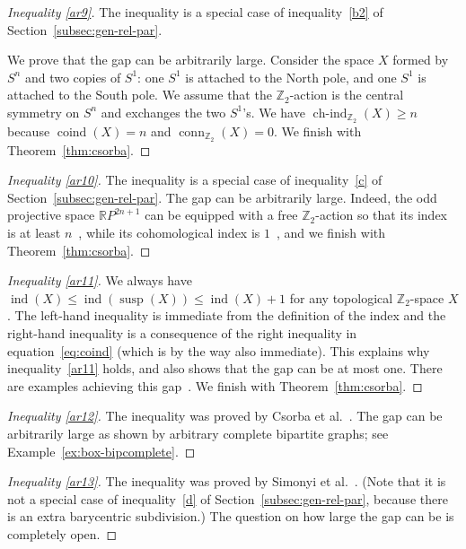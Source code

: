 \documentclass[12pt]{amsart}
\theoremstyle{definition}
\def\R{\mathbb{R}}
\def\Z{\mathbb{Z}}
\renewcommand{\geq}{\geqslant}
\renewcommand{\leq}{\leqslant}
\def\susp{\operatorname{susp}}
\def\conn{\operatorname{conn}}
\def\coind{\operatorname{coind}}
\def\ind{\operatorname{ind}}
\def\hind{\operatorname{ch-ind}_{\Z_2}}
\begin{document}
\begin{proof}[Inequality \eqref{ar9}]
The inequality is a special case of inequality~\eqref{b2} of Section~\ref{subsec:gen-rel-par}.

We prove that the gap can be arbitrarily large. Consider the space $X$ formed by $S^n$ and two copies of $S^1$: one $S^1$ is attached to the North pole, and one $S^1$ is attached to the South pole. We assume that the $\Z_2$-action is the central symmetry on $S^n$ and exchanges the two $S^1$'s. We have $\hind(X) \geq n$ because $\coind(X) = n$ and $\conn_{\Z_2} (X) = 0$. We finish with Theorem~\ref{thm:csorba}.
\end{proof}

\begin{proof}[Inequality \eqref{ar10}]
The inequality is a special case of inequality~\eqref{c} of Section~\ref{subsec:gen-rel-par}. The gap can be arbitrarily large. Indeed, the odd projective space $\R P^{2n+1}$ can be equipped with a free $\Z_2$-action so that its index is at least $n$~\cite{stolz1989level}, while its cohomological index is $1$~\cite[Theorem 6.6]{conner1960}, and we finish with Theorem~\ref{thm:csorba}.%
\end{proof}

\begin{proof}[Inequality \eqref{ar11}]
We always have $\ind(X) \leq \ind(\susp(X)) \leq \ind(X) + 1$ for any topological $\Z_2$-space $X$. The left-hand inequality is immediate from the definition of the index and the right-hand inequality is a consequence of the right inequality in equation~\eqref{eq:coind} (which is by the way also immediate). This explains why inequality~\eqref{ar11} holds, and also shows that the gap can be at most one. There are examples achieving this gap~\cite{csorba2007homotopy}. We finish with Theorem~\ref{thm:csorba}.
\end{proof}

\begin{proof}[Inequality \eqref{ar12}]
The inequality was proved by Csorba et al.~\cite{csorba2004box}. The gap can be arbitrarily large as shown by arbitrary complete bipartite graphs; see Example~\ref{ex:box-bipcomplete}.
\end{proof}

\begin{proof}[Inequality \eqref{ar13}]
The inequality was proved by Simonyi et al.~\cite{simonyi2013colourful}. (Note that it is not a special case of inequality~\eqref{d} of Section~\ref{subsec:gen-rel-par}, because there is an extra barycentric subdivision.) The question on how large the gap can be is completely open.
\end{proof}
\end{document}
